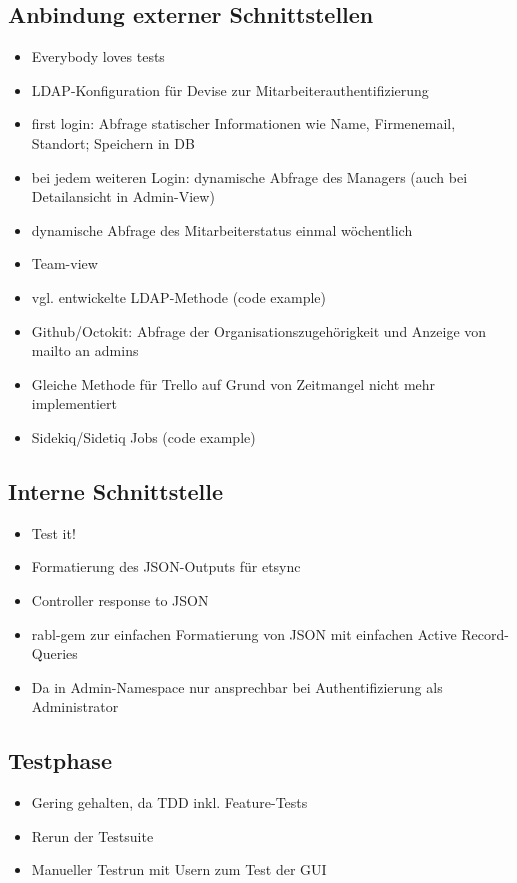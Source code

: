 \subsection{Anbindung externer Schnittstellen}
\label{sec:Anbindung externer Schnittstellen}
\begin{itemize}
	\item Everybody loves tests
	\item LDAP-Konfiguration für Devise zur Mitarbeiterauthentifizierung
	\item first login: Abfrage statischer Informationen wie Name, Firmenemail, Standort; Speichern in DB
	\item bei jedem weiteren Login: dynamische Abfrage des Managers (auch bei Detailansicht in Admin-View)
	\item dynamische Abfrage des Mitarbeiterstatus einmal wöchentlich
	\item Team-view
	\item vgl. entwickelte LDAP-Methode (code example)
	\item Github/Octokit: Abfrage der Organisationszugehörigkeit und Anzeige von mailto an admins
	\item Gleiche Methode für Trello auf Grund von Zeitmangel nicht mehr implementiert
	\item Sidekiq/Sidetiq Jobs (code example)
\end{itemize}

\subsection{Interne Schnittstelle}
\label{sec:Interne Schnittstelle}
\begin{itemize}
	\item Test it!
	\item Formatierung des JSON-Outputs für etsync
	\item Controller response to JSON
	\item rabl-gem zur einfachen Formatierung von JSON mit einfachen Active Record-Queries
	\item Da in Admin-Namespace nur ansprechbar bei Authentifizierung als Administrator
\end{itemize}

\subsection{Testphase}
\label{sec:Testphase}
\begin{itemize}
	\item Gering gehalten, da TDD inkl. Feature-Tests
	\item Rerun der Testsuite
	\item Manueller Testrun mit Usern zum Test der GUI
\end{itemize}

